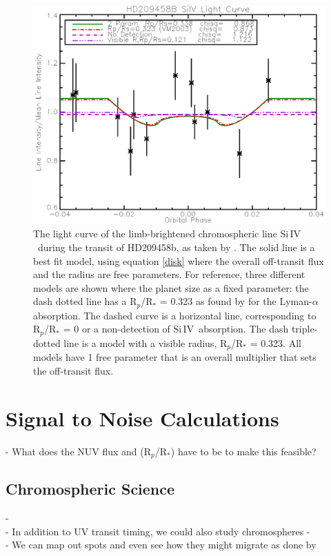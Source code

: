 \documentclass[manuscript]{aastex}
\newcommand{\siIV}{\ensuremath{\mathrm{Si}\,\scriptstyle \mathrm{IV}}}
\begin{document}
\begin{figure}[!ht]
\includegraphics[width=0.9 \textwidth]{hd209458.eps}
\caption{The light curve of the limb-brightened chromospheric line \siIV\ during the transit of HD209458b, as taken by \citet{vidmad}. The solid line is a best fit model, using equation \ref{disk} where the overall off-transit flux and the radius are free parameters. For reference, three different models are shown where the planet size as a fixed parameter: the dash dotted line has a R$_p$/R$_*$ = 0.323 as found by \citet{vidmad} for the Lyman-$\alpha$ absorption. The dashed curve is a horizontal line, corresponding to R$_p$/R$_*$ = 0 or a non-detection of \siIV\ absorption. The dash triple-dotted line is a model with a visible radius, R$_p$/R$_*$ = 0.323. All models have 1 free parameter that is an overall multiplier that sets the off-transit flux.}
\label{fig03}
\end{figure}

\section{Signal to Noise Calculations} \label{labl:sn}
- What does the NUV flux and (R$_p$/R$_*$) have to be to make this feasible?

\subsection{Chromospheric Science} \label{labl:cscience}
- \\
- In addition to UV transit timing, we could also study chromospheres
- \\
- We can map out spots and even see how they might migrate as done by \citet{2010arXiv1002.4113H}
\end{document}
